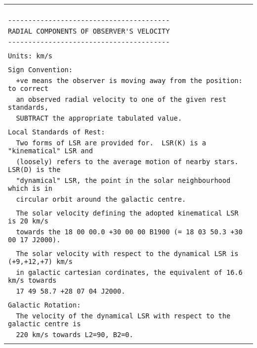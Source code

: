 \begin{center}
\begin{tabular}{|l|}
\hline
\verb|                                                                                                                                    |\\
\verb|----------------------------------------|\\
\verb|RADIAL COMPONENTS OF OBSERVER'S VELOCITY|\\
\verb|----------------------------------------|\\
\\
\verb|Units: km/s|\\
\\
\verb|Sign Convention:|\\
\verb|  +ve means the observer is moving away from the position:  to correct|\\
\verb|  an observed radial velocity to one of the given rest standards,|\\
\verb|  SUBTRACT the appropriate tabulated value.|\\
\\
\verb|Local Standards of Rest:|\\
\verb|  Two forms of LSR are provided for.  LSR(K) is a "kinematical" LSR and|\\
\verb|  (loosely) refers to the average motion of nearby stars.  LSR(D) is the|\\
\verb|  "dynamical" LSR, the point in the solar neighbourhood which is in|\\
\verb|  circular orbit around the galactic centre.|\\
\\
\verb|  The solar velocity defining the adopted kinematical LSR is 20 km/s|\\
\verb|  towards the 18 00 00.0 +30 00 00 B1900 (= 18 03 50.3 +30 00 17 J2000).|\\
\\
\verb|  The solar velocity with respect to the dynamical LSR is (+9,+12,+7) km/s|\\
\verb|  in galactic cartesian cordinates, the equivalent of 16.6 km/s towards|\\
\verb|  17 49 58.7 +28 07 04 J2000.|\\
\\
\verb|Galactic Rotation:|\\
\verb|  The velocity of the dynamical LSR with respect to the galactic centre is|\\
\verb|  220 km/s towards L2=90, B2=0.|\\
\\

\end{tabular}
\end{center}
